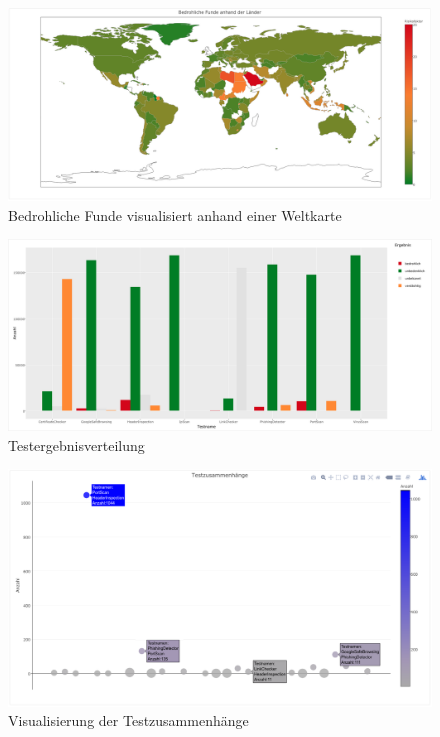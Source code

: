 \begin{landscape}
\begin{figure}[H]
  \centering
  \includegraphics[width=\textheight]{images/stats/weltkarte}
  \caption{Bedrohliche Funde visualisiert anhand einer Weltkarte}
  \label{fig:weltkarte}
\end{figure}

\begin{figure}[H]
  \centering
  \includegraphics[width=\textheight]{images/stats/ergebnisverteilung}
  \caption{Testergebnisverteilung}
  \label{fig:ergebnisverteilung}
\end{figure}

\begin{figure}[H]
  \centering
  \includegraphics[width=\textheight]{images/stats/testzusammenhaenge}
  \caption{Visualisierung der Testzusammenhänge}
  \label{fig:testzusammenhaenge}
\end{figure}


\end{landscape}
